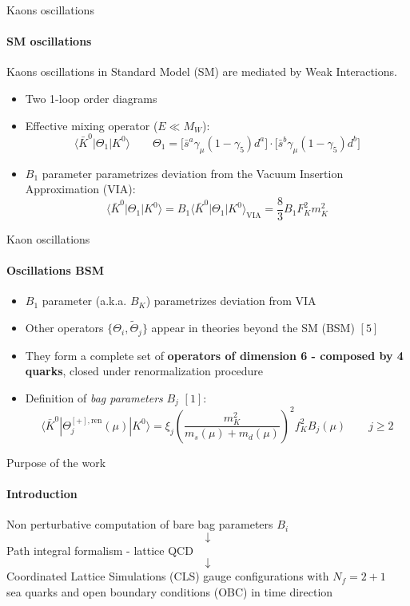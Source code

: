 \documentclass{beamer}
\newcommand{\la}{\langle}
\newcommand{\ra}{\rangle}
\begin{document}
\begin{frame}{Kaons oscillations}
      \framesubtitle{SM oscillations}
      Kaons oscillations in Standard Model (SM) are mediated by Weak Interactions.
      \begin{itemize}
            \item Two 1-loop order diagrams
            \item Effective mixing operator ($E \ll M_W$):
            \begin{equation*}
                  \la \bar K^0 | \Theta_1 | K^0 \ra \qquad \Theta_1 = \Big[ \bar s^a \gamma_\mu (1-\gamma_5) d^a \Big] \cdot \Big[ \bar s^b \gamma_\mu (1-\gamma_5) d^b \Big]
            \end{equation*}
            \item $B_1$ parameter parametrizes deviation from the Vacuum Insertion Approximation (VIA):
            \begin{equation*}
                  \la \bar K^0 | \Theta_1 | K^0 \ra = B_1 \la \bar K^0 | \Theta_1 | K^0 \ra_\text{VIA} = \frac{8}{3} B_1 F_K^2 m_K^2
            \end{equation*}
      \end{itemize}
\end{frame}

\begin{frame}[fragile]{Kaon oscillations}
      \framesubtitle{Oscillations BSM}
      \begin{itemize}
            \item $B_1$ parameter (a.k.a. $B_K$) parametrizes deviation from VIA
            \item Other operators $\{\Theta_i,\tilde\Theta_j\}$ appear in theories beyond the SM (BSM) $[5]$
            \item They form a complete set of {\bf operators of dimension 6 - composed by 4 quarks}, closed under renormalization procedure
            \item Definition of \emph{bag parameters} $B_j$ $[1]$:
            \begin{equation*}
                  \la \bar K^0 | \Theta_j^{[+],\text{ren}} (\mu) | K^0 \ra = \xi_j \left(\frac{m_K^2}{m_s(\mu)+m_d(\mu)}\right)^2 f_K^2 B_j(\mu) \qquad j \ge 2
            \end{equation*}
      \end{itemize}
\end{frame}

\begin{frame}{Purpose of the work}
      \framesubtitle{Introduction}
      \centering
      Non perturbative computation of bare bag parameters $B_i$
      $$\downarrow$$
      Path integral formalism - lattice QCD
      $$\downarrow$$
      Coordinated Lattice Simulations (CLS) gauge configurations with $N_f = 2+1 $\\ sea quarks and open boundary conditions (OBC) in time direction
\end{frame}
\end{document}
